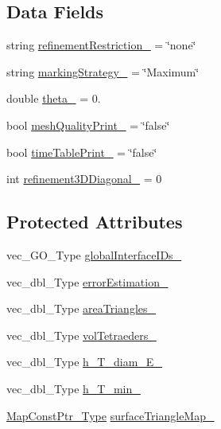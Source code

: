 \subsection*{Data Fields}
\begin{DoxyCompactItemize}
\item 
string \hyperlink{classFEDD_1_1ErrorEstimation_ae187dd8db953862a2395d897e1317117}{refinement\+Restriction\+\_\+} = \char`\"{}none\char`\"{}
\item 
string \hyperlink{classFEDD_1_1ErrorEstimation_a235e923a33a175e7d884e1a2a6e0c7ec}{marking\+Strategy\+\_\+} = \char`\"{}Maximum\char`\"{}
\item 
double \hyperlink{classFEDD_1_1ErrorEstimation_a44fd0e48a1ed6edf6702058b7c43b170}{theta\+\_\+} = 0.
\item 
bool \hyperlink{classFEDD_1_1ErrorEstimation_a2db28f9a5cd90b6bb3abba15ed4ed7f0}{mesh\+Quality\+Print\+\_\+} = \char`\"{}false\char`\"{}
\item 
bool \hyperlink{classFEDD_1_1ErrorEstimation_aa1eaedab0d65507fec1b175f971bdecd}{time\+Table\+Print\+\_\+} = \char`\"{}false\char`\"{}
\item 
int \hyperlink{classFEDD_1_1ErrorEstimation_a3695b55e1703c3c03077bbc17a44fae9}{refinement3\+D\+Diagonal\+\_\+} = 0
\end{DoxyCompactItemize}
\subsection*{Protected Attributes}
\begin{DoxyCompactItemize}
\item 
vec\+\_\+\+G\+O\+\_\+\+Type \hyperlink{classFEDD_1_1ErrorEstimation_afb6eb1618023286bcbd18b59023752fb}{global\+Interface\+I\+Ds\+\_\+}
\item 
vec\+\_\+dbl\+\_\+\+Type \hyperlink{classFEDD_1_1ErrorEstimation_a477f016c78940297ee1346642dd5fa15}{error\+Estimation\+\_\+}
\item 
vec\+\_\+dbl\+\_\+\+Type \hyperlink{classFEDD_1_1ErrorEstimation_ae0395855399463136ef23963c50d92fb}{area\+Triangles\+\_\+}
\item 
vec\+\_\+dbl\+\_\+\+Type \hyperlink{classFEDD_1_1ErrorEstimation_a85be16035eebc82df031a58d7cdf8e8e}{vol\+Tetraeders\+\_\+}
\item 
vec\+\_\+dbl\+\_\+\+Type \hyperlink{classFEDD_1_1ErrorEstimation_a984034d2b0306ed7c194c6ca5dbfbc40}{h\+\_\+\+T\+\_\+diam\+\_\+\+E\+\_\+}
\item 
vec\+\_\+dbl\+\_\+\+Type \hyperlink{classFEDD_1_1ErrorEstimation_a641cf149d34e2423bf9cbba020cb234a}{h\+\_\+\+T\+\_\+min\+\_\+}
\item 
\hyperlink{classFEDD_1_1ErrorEstimation_ad45c898ab6123b9e7d5efbc0e5365ccf}{Map\+Const\+Ptr\+\_\+\+Type} \hyperlink{classFEDD_1_1ErrorEstimation_a76311ceaa85a3e2f8c1abccb2d62a63b}{surface\+Triangle\+Map\+\_\+}
\end{DoxyCompactItemize}


